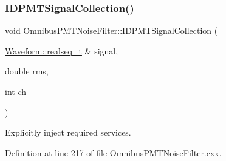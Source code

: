 \subsubsection{\texorpdfstring{I\+D\+P\+M\+T\+Signal\+Collection()}{IDPMTSignalCollection()}}
{\footnotesize\ttfamily void Omnibus\+P\+M\+T\+Noise\+Filter\+::\+I\+D\+P\+M\+T\+Signal\+Collection (\begin{DoxyParamCaption}\item[{\hyperlink{namespace_wire_cell_1_1_waveform_a479175e541c8545e87cd8063b74b6956}{Waveform\+::realseq\+\_\+t} \&}]{signal,  }\item[{double}]{rms,  }\item[{int}]{ch }\end{DoxyParamCaption})}



Explicitly inject required services. 



Definition at line 217 of file Omnibus\+P\+M\+T\+Noise\+Filter.\+cxx.

